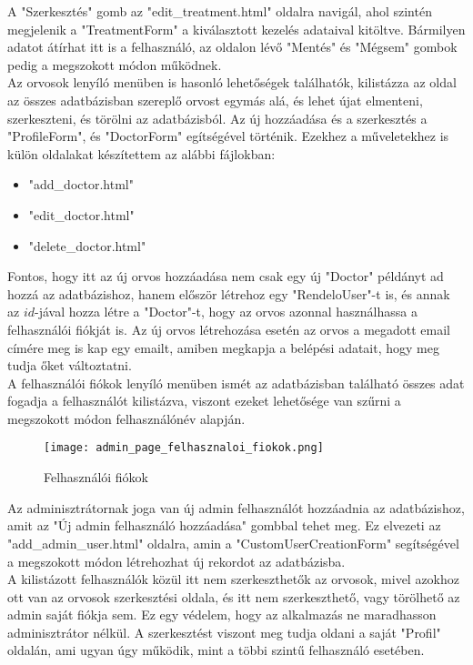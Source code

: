A "Szerkesztés" gomb az "edit\_treatment.html" oldalra navigál, ahol szintén megjelenik a "TreatmentForm" a kiválasztott kezelés adataival kitöltve. Bármilyen adatot átírhat itt is a felhasználó, az oldalon lévő "Mentés" és "Mégsem" gombok pedig a megszokott módon működnek.\\

Az orvosok lenyíló menüben is hasonló lehetőségek találhatók, kilistázza az oldal az összes adatbázisban szereplő orvost egymás alá, és lehet újat elmenteni, szerkeszteni, és törölni az adatbázisból. Az új hozzáadása és a szerkesztés a "ProfileForm", és "DoctorForm" egítségével történik. Ezekhez a műveletekhez is külön oldalakat készítettem az alábbi fájlokban:

\begin{itemize}
	\item "add\_doctor.html"
	\item "edit\_doctor.html"
	\item "delete\_doctor.html"
\end{itemize}

Fontos, hogy itt az új orvos hozzáadása nem csak egy új "Doctor" példányt ad hozzá az adatbázishoz, hanem először létrehoz egy "RendeloUser"-t is, és annak az $id$-jával hozza létre a "Doctor"-t, hogy az orvos azonnal használhassa a felhasználói fiókját is. Az új orvos létrehozása esetén az orvos a megadott email címére meg is kap egy emailt, amiben megkapja a belépési adatait, hogy meg tudja őket változtatni.\\

A felhasználói fiókok lenyíló menüben ismét az adatbázisban található összes adat fogadja a felhasználót kilistázva, viszont ezeket lehetősége van szűrni a megszokott módon felhasználónév alapján.

\begin{figure}[!htbp]
	\caption{Felhasználói fiókok}
	\label{fig:felhasznaloifiokok}
	\centering
	\texttt{[image: admin\_page\_felhasznaloi\_fiokok.png]}
\end{figure}

Az adminisztrátornak joga van új admin felhasználót hozzáadnia az adatbázishoz, amit az "Új admin felhasználó hozzáadása" gombbal tehet meg. Ez elvezeti az "add\_admin\_user.html" oldalra, amin a "CustomUserCreationForm" segítségével a megszokott módon létrehozhat új rekordot az adatbázisba.\\

A kilistázott felhasználók közül itt nem szerkeszthetők az orvosok, mivel azokhoz ott van az orvosok szerkesztési oldala, és itt nem szerkeszthető, vagy törölhető az admin saját fiókja sem. Ez egy védelem, hogy az alkalmazás ne maradhasson adminisztrátor nélkül. A szerkesztést viszont meg tudja oldani a saját "Profil" oldalán, ami ugyan úgy működik, mint a többi szintű felhasználó esetében.

